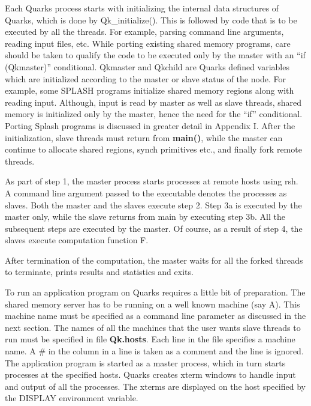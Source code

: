 Each Quarks process starts with initializing the internal data
structures of Quarks, which is done by Qk\_initialize(). This is followed
by code that is to be executed by all the threads. For example,
parsing command line arguments, reading input files, etc. While
porting existing shared memory programs, care should be taken to
qualify the code to be executed only by the master with an 
``if (Qkmaster)'' conditional. Qkmaster and Qkchild are Quarks defined
variables which are initialized according to the master or slave
status of the node. For example, some SPLASH
programs initialize shared memory regions along with reading input.
Although, input is read by master as well as slave threads, shared
memory is initialized only by the master, hence the need for the
``if'' conditional. Porting Splash programs is discussed in greater
detail in Appendix I.
After the initialization, slave threads must return from {\bf main()}, while
the master can continue to allocate shared regions, synch primitives
etc., and finally fork remote threads. 

As part of step 1, the master process starts processes at remote hosts
using rsh. A command line argument passed to the executable denotes
the processes as slaves. Both the master and the slaves execute step
2. Step 3a is executed by the master only, while the slave returns
from main by executing step 3b. All the subsequent steps are executed
by the master. Of course, as a result of step 4, the slaves execute
computation function F. 

After termination of the computation, the master waits for all the
forked threads to terminate, prints results and statistics and exits.


To run an application program on Quarks requires a little bit of
preparation. The shared memory server has to be running on a well
known machine (say A). This machine name must be specified as a
command line parameter as discussed in the next section. 
The names of all the machines that the
user wants slave threads to run must be specified in file
{\bf Qk.hosts}. Each line in the file specifies a machine name. A \#
in the column in a line is taken as a comment and the line is ignored.
The application program is started as a master process,
which in turn starts processes at the specified hosts. Quarks creates
xterm windows to handle input and output of all the processes. The
xterms are displayed on the host specified by the DISPLAY environment
variable. 


